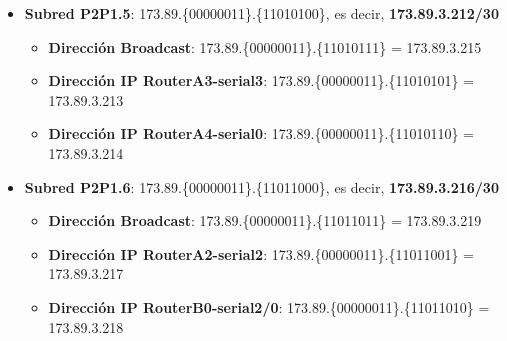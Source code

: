 \begin{itemize}
\begin{itemize}
		\end{itemize}
	\item{\textbf{Subred P2P1.5}:} 173.89.\{\textcolor{azul}{000000}\textcolor{rojo}{11}\}.\{\textcolor{rojo}{110101}00\}, es decir, \textbf{173.89.3.212/30}
		\begin{itemize}
			\item{\textbf{Dirección Broadcast}}: 173.89.\{\textcolor{azul}{000000}\textcolor{rojo}{11}\}.\{\textcolor{rojo}{110101}11\} = 173.89.3.215
			\item{\textbf{Dirección IP RouterA3-serial3}}: 173.89.\{\textcolor{azul}{000000}\textcolor{rojo}{11}\}.\{\textcolor{rojo}{110101}01\} = 173.89.3.213
			\item{\textbf{Dirección IP RouterA4-serial0}}: 173.89.\{\textcolor{azul}{000000}\textcolor{rojo}{11}\}.\{\textcolor{rojo}{110101}10\} = 173.89.3.214
		\end{itemize}
	\item{\textbf{Subred P2P1.6}:} 173.89.\{\textcolor{azul}{000000}\textcolor{rojo}{11}\}.\{\textcolor{rojo}{110110}00\}, es decir, \textbf{173.89.3.216/30}
		\begin{itemize}
			\item{\textbf{Dirección Broadcast}}: 173.89.\{\textcolor{azul}{000000}\textcolor{rojo}{11}\}.\{\textcolor{rojo}{110110}11\} = 173.89.3.219
			\item{\textbf{Dirección IP RouterA2-serial2}}: 173.89.\{\textcolor{azul}{000000}\textcolor{rojo}{11}\}.\{\textcolor{rojo}{110110}01\} = 173.89.3.217
			\item{\textbf{Dirección IP RouterB0-serial2/0}}: 173.89.\{\textcolor{azul}{000000}\textcolor{rojo}{11}\}.\{\textcolor{rojo}{110110}10\} = 173.89.3.218
		\end{itemize}
\end{itemize}

